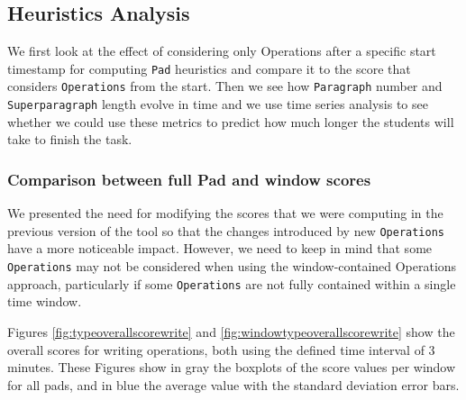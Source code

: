 \subsection{Heuristics Analysis}
    We first look at the effect of considering only Operations after a specific start timestamp for computing \texttt{Pad} heuristics and compare it  to the score that considers \texttt{Operations} from the start. Then we see how \texttt{Paragraph} number and \texttt{Superparagraph} length evolve in time and we use time series analysis to see whether we could use these metrics to predict how much longer the students will take to finish the task.
    \subsubsection{Comparison between full Pad and window scores}
        We presented the need for modifying the scores that we were computing in the previous version of the tool so that the changes introduced by new \texttt{Operations} have a more noticeable impact.
        However, we need to keep in mind that some \texttt{Operations} may not be considered when using the window-contained Operations approach, particularly if some \texttt{Operations} are not fully contained within a single time window.

        Figures \ref{fig:typeoverallscorewrite} and \ref{fig:windowtypeoverallscorewrite} show the overall scores for writing operations, both using the defined time interval of 3 minutes. These Figures show in gray the boxplots of the score values per window for all pads, and in blue the average value with the standard deviation error bars.
    

